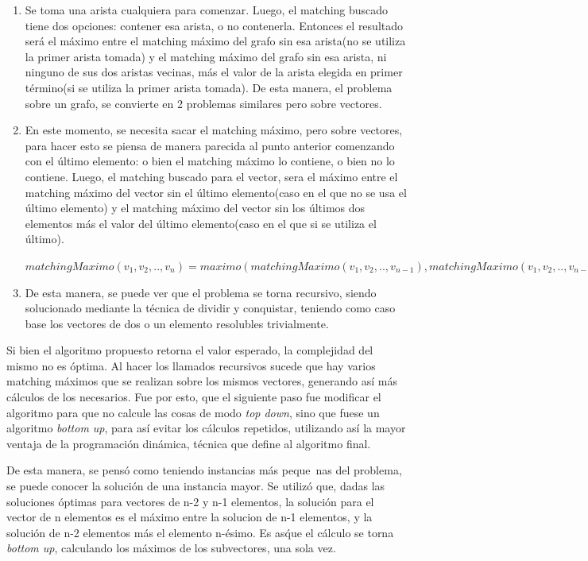 \documentclass[a4paper, 12pt]{article}
\begin{document}
\begin{enumerate}
\item Se toma una arista cualquiera para comenzar. Luego, el matching buscado tiene dos opciones: contener esa arista, o no contenerla. Entonces el resultado ser\'a el m\'aximo entre el matching m\'aximo del grafo sin esa arista(no se utiliza la primer arista tomada) y el matching m\'aximo del grafo sin esa arista, ni ninguno de sus dos aristas vecinas, m\'as el valor de la arista elegida en primer t\'ermino(si se utiliza la primer arista tomada). De esta manera, el problema sobre un grafo, se convierte en 2 problemas similares pero sobre vectores.
\item En este momento, se necesita sacar el matching m\'aximo, pero sobre vectores, para hacer esto se piensa de manera parecida al punto anterior comenzando con el \'ultimo elemento: o bien el matching m\'aximo lo contiene, o bien no lo contiene. Luego, el matching buscado para el vector, sera el m\'aximo entre el matching m\'aximo del vector sin el \'ultimo elemento(caso en el que no se usa el \'ultimo elemento) y el matching m\'aximo del vector sin los \'ultimos dos elementos m\'as el valor del \'ultimo elemento(caso en el que si se utiliza el \'ultimo).

	$matchingMaximo(v_1,v_2,..,v_n) = maximo(matchingMaximo(v_1,v_2,..,v_{n-1}), matchingMaximo(v_1,v_2,..,v_{n-2}) + v_n)$
\item De esta manera, se puede ver que el problema se torna recursivo, siendo solucionado mediante la t\'ecnica de dividir y conquistar, teniendo como caso base los vectores de dos o un elemento resolubles trivialmente.
\end{enumerate}

Si bien el algoritmo propuesto retorna el valor esperado, la complejidad del mismo no es \'optima. Al hacer los llamados recursivos sucede que hay varios matching m\'aximos que se realizan sobre los mismos vectores, generando as\'i m\'as c\'alculos de los necesarios. Fue por esto, que el siguiente paso fue modificar el algoritmo para que no calcule las cosas de modo \emph{top down}, sino que fuese un algoritmo \emph{bottom up}, para as\'i evitar los c\'alculos repetidos, utilizando as\'i la mayor ventaja de la programaci\'on din\'amica, t\'ecnica que define al algoritmo final.

De esta manera, se pens\'o como teniendo instancias m\'as peque~{n}as del problema, se puede conocer la soluci\'on de una instancia mayor. Se utiliz\'o que, dadas las soluciones \'optimas para vectores de n-2 y n-1 elementos, la soluci\'on para el vector de n elementos es el m\'aximo entre la solucion de n-1 elementos, y la soluci\'on de n-2 elementos m\'as el elemento n-\'esimo. Es as\' que el c\'alculo se torna \emph{bottom up}, calculando los m\'aximos de los subvectores, una sola vez.
\end{document}
